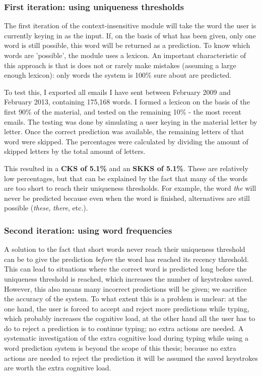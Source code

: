 \documentclass[11pt]{article}
\begin{document}
\subsubsection{First iteration: using uniqueness thresholds}

The first iteration of the context-insensitive module will take the word the user is currently keying in as the input. If, on the basis of what has been given, only one word is still possible, this word will be returned as a prediction. To know which words are 'possible', the module uses a lexicon. An important characteristic of this approach is that is does not or rarely make mistakes (assuming a large enough lexicon): only words the system is 100\% sure about are predicted.

To test this, I exported all emails I have sent between February 2009 and February 2013, containing 175,168 words. I formed a lexicon on the basis of the first 90\% of the material, and tested on the remaining 10\% - the most recent emails. The testing was done by simulating a user keying in the material letter by letter. Once the correct prediction was available, the remaining letters of that word were skipped. The percentages were calculated by dividing the amount of skipped letters by the total amount of letters.

This resulted in a \textbf{CKS of 5.1\%} and an \textbf{SKKS of 5.1\%}. These are relatively low percentages, but that can be explained by the fact that many of the words are too short to reach their uniqueness thresholds. For example, the word \emph{the} will never be predicted because even when the word is finished, alternatives are still possible (\emph{these}, \emph{there}, etc.).

\subsubsection{Second iteration: using word frequencies}
A solution to the fact that short words never reach their uniqueness threshold can be to give the prediction \emph{before} the word has reached its recency threshold. This can lead to situations where the correct word is predicted long before the uniqueness threshold is reached, which increases the number of keystrokes saved. However, this also means many incorrect predictions will be given; we sacrifice the accuracy of the system. To what extent this is a problem is unclear: at the one hand, the user is forced to accept and reject more predictions while typing, which probably increases the cognitive load, at the other hand all the user has to do to reject a prediction is to continue typing; no extra actions are needed. A systematic investigation of the extra cognitive load during typing while using a word prediction system is beyond the scope of this thesis; because no extra actions are needed to reject the prediction it will be assumed the saved keystrokes are worth the extra cognitive load.
\end{document}
